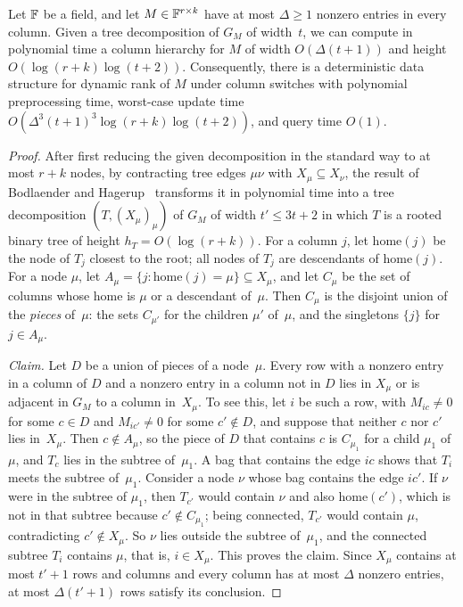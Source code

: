 \begin{corollary}\label{cor:treewidth}
Let $\mathbb{F}$ be a field, and let $M\in\mathbb{F}^{r\times k}$ have at most $\Delta\ge1$ nonzero entries in every column.
Given a tree decomposition of $G_M$ of width~$t$, we can compute in polynomial time a column hierarchy for $M$ of width $O(\Delta(t+1))$ and height $O(\log(r+k)\log(t+2))$.
Consequently, there is a deterministic data structure for dynamic rank of $M$ under column switches with polynomial preprocessing time, worst-case update time $O(\Delta^3(t+1)^3\log(r+k)\log(t+2))$, and query time $O(1)$.
\end{corollary}

\begin{proof}
After first reducing the given decomposition in the standard way to at most $r+k$ nodes, by contracting tree edges $\mu\nu$ with $X_\mu\subseteq X_\nu$, the result of Bodlaender and Hagerup~\cite{BH98} transforms it in polynomial time into a tree decomposition $(T,(X_\mu)_\mu)$ of $G_M$ of width $t'\le3t+2$ in which $T$ is a rooted binary tree of height $h_T=O(\log(r+k))$.
For a column $j$, let $\mathrm{home}(j)$ be the node of $T_j$ closest to the root; all nodes of $T_j$ are descendants of $\mathrm{home}(j)$.
For a node $\mu$, let \mbox{$A_\mu=\{j:\mathrm{home}(j)=\mu\}\subseteq X_\mu$}, and let $C_\mu$ be the set of columns whose home is $\mu$ or a descendant of~$\mu$.
Then $C_\mu$ is the disjoint union of the \emph{pieces} of~$\mu$: the sets $C_{\mu'}$ for the children $\mu'$ of~$\mu$, and the singletons $\{j\}$ for $j\in A_\mu$.

\emph{Claim.} Let $D$ be a union of pieces of a node~$\mu$.
Every row with a nonzero entry in a column of $D$ and a nonzero entry in a column not in $D$ lies in $X_\mu$ or is adjacent in $G_M$ to a column in~$X_\mu$.
To see this, let $i$ be such a row, with $M_{ic}\ne0$ for some $c\in D$ and $M_{ic'}\ne0$ for some $c'\notin D$, and suppose that neither $c$ nor $c'$ lies in~$X_\mu$.
Then $c\notin A_\mu$, so the piece of $D$ that contains $c$ is $C_{\mu_1}$ for a child $\mu_1$ of~$\mu$, and $T_c$ lies in the subtree of~$\mu_1$.
A bag that contains the edge $ic$ shows that $T_i$ meets the subtree of~$\mu_1$.
Consider a node $\nu$ whose bag contains the edge $ic'$.
If $\nu$ were in the subtree of $\mu_1$, then $T_{c'}$ would contain $\nu$ and also $\mathrm{home}(c')$, which is not in that subtree because $c'\notin C_{\mu_1}$; being connected, $T_{c'}$ would contain $\mu$, contradicting $c'\notin X_\mu$.
So $\nu$ lies outside the subtree of~$\mu_1$, and the connected subtree $T_i$ contains $\mu$, that is, $i\in X_\mu$.
This proves the claim.
Since $X_\mu$ contains at most $t'+1$ rows and columns and every column has at most $\Delta$ nonzero entries, at most $\Delta(t'+1)$ rows satisfy its conclusion.


\end{proof}
